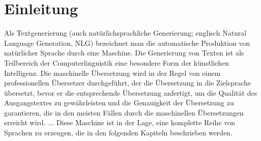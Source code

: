 \chapter{Einleitung}

Als Textgenerierung (auch natürlichsprachliche Generierung; englisch Natural Language Generation, NLG) bezeichnet man die automatische Produktion von natürlicher Sprache durch eine Maschine. Die Generierung von Texten ist als Teilbereich der Computerlinguistik eine besondere Form der künstlichen Intelligenz. 
Die maschinelle Übersetzung wird in der Regel von einem professionellen Übersetzer durchgeführt, der die Übersetzung in die Zielsprache übersetzt, bevor er die entsprechende Übersetzung anfertigt, um die Qualität des Ausgangstextes zu gewährleisten und die Genauigkeit der Übersetzung zu garantieren, die in den meisten Fällen durch die maschinellen Übersetzungen erreicht wird. ...
Diese Maschine ist in der Lage, eine komplette Reihe von Sprachen zu erzeugen, die in den folgenden Kapiteln beschrieben werden.
